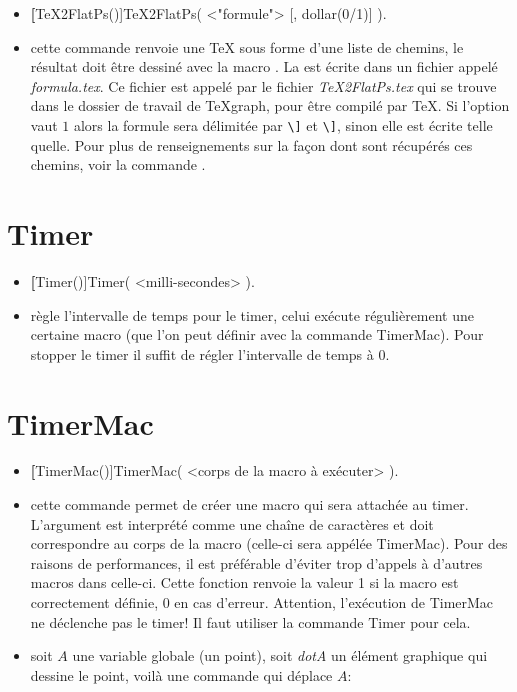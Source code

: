 \begin{itemize}
 \item \util \textbf[TeX2FlatPs()]{TeX2FlatPs( <"formule"> [, dollar(0/1)] )}.
 \item \desc cette commande renvoie une  \TeX{} sous forme d'une liste de chemins, le résultat doit être dessiné avec la macro . La  est écrite dans un fichier appelé \textit{formula.tex}. Ce fichier est appelé par le fichier \textit{TeX2FlatPs.tex} qui se trouve dans le dossier de travail de TeXgraph, pour être compilé par \TeX{}. Si l'option  vaut $1$ alors la formule sera délimitée par \verb|\]| et \verb|\]|, sinon elle est écrite telle quelle. Pour plus de renseignements sur la façon dont sont récupérés ces chemins, voir la commande .
\end{itemize}


\section{Timer}\label{cmdTimer}

\begin{itemize}
 \item \util \textbf[Timer()]{Timer( <milli-secondes> )}.
 \item \desc règle l'intervalle de temps pour le timer, celui exécute régulièrement une certaine macro (que l'on peut définir avec la commande TimerMac). Pour stopper le timer il suffit de régler l'intervalle de temps à 0.
\end{itemize}

\section{TimerMac}\label{cmdTimerMac}

\begin{itemize}
 \item \util \textbf[TimerMac()]{TimerMac( <corps de la macro à exécuter> )}.
 \item \desc cette commande permet de créer une macro qui sera attachée au timer. L'argument est interprété comme une chaîne de caractères et doit correspondre au corps de la macro (celle-ci sera appélée TimerMac). Pour des raisons de performances, il est préférable d'éviter trop d'appels à d'autres macros dans celle-ci. Cette fonction renvoie la valeur 1 si la macro est correctement définie, 0 en cas d'erreur. Attention, l'exécution de TimerMac ne déclenche pas le timer! Il faut utiliser la commande Timer pour cela. 
 \item \exem soit $A$ une variable globale (un point), soit \textit{dotA} un élément graphique qui dessine le point, voilà une commande qui déplace $A$: 

\centerline{
\co{[TimerMac("[Inc(A,0.1), if Re(A)>5 then Timer(0) else ReCalc(dotA) fi]"), A:=-5, Timer(10)]}}
\end{itemize}

